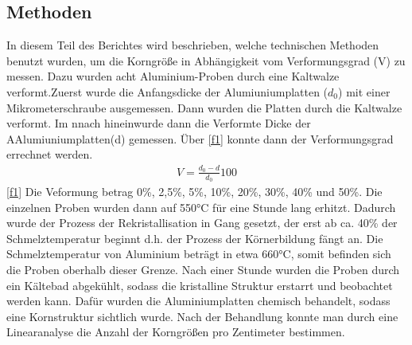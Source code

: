 \documentclass[
	a4paper,
	12pt,
	pagesize,
	ngerman
]{scrartcl}
\begin{document}
\subsection{Methoden}
In diesem Teil des Berichtes wird beschrieben, welche technischen Methoden benutzt wurden, um die Korngröße in Abhängigkeit vom Verformungsgrad (V) zu messen. Dazu wurden acht Aluminium-Proben durch eine Kaltwalze verformt.Zuerst wurde die Anfangsdicke der Alumiuniumplatten ($d_0$) mit einer Mikrometerschraube ausgemessen. Dann wurden die Platten durch die Kaltwalze verformt. Im nnach hineinwurde dann die Verformte Dicke der AAlumiuniumplatten(d) gemessen. Über \cref{f1} konnte dann der Verformungsgrad errechnet werden.
 \begin{align}
    V = \frac{d_0-d}{d_0}100 \label{f1}
\end{align} \cref{f1}
Die Veformung betrag 0\%, 2,5\%, 5\%, 10\%, 20\%, 30\%, 40\% und 50\%.
Die einzelnen Proben wurden dann auf 550°C für eine Stunde lang erhitzt. Dadurch wurde der Prozess der Rekristallisation in Gang gesetzt, der erst ab ca. 40\% der Schmelztemperatur beginnt d.h. der Prozess der Körnerbildung fängt an. Die Schmelztemperatur von Aluminium beträgt in etwa 660°C, somit befinden sich die Proben oberhalb dieser Grenze. Nach einer Stunde wurden die Proben durch ein Kältebad abgekühlt, sodass die kristalline Struktur erstarrt und beobachtet werden kann. Dafür wurden die Aluminiumplatten chemisch behandelt, sodass eine Kornstruktur sichtlich wurde. Nach der Behandlung konnte man durch eine Linearanalyse die Anzahl der Korngrößen pro Zentimeter bestimmen.
\end{document}
